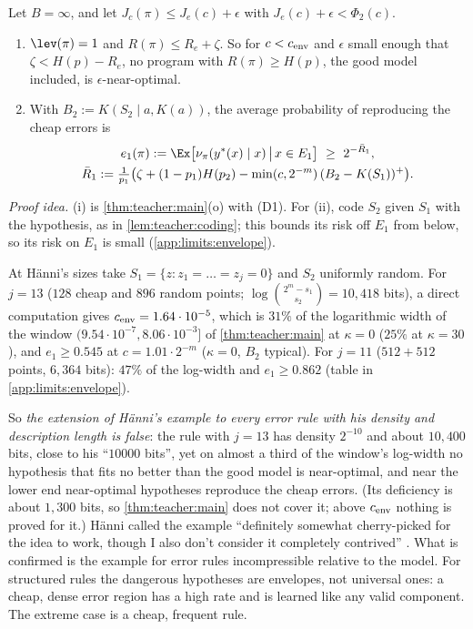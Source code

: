 \begin{proposition}\label{prop:limits:envelope}
Let $B=\infty$, and let $J_c(\pi)\le J_e(c)+\epsilon$ with $J_e(c)+\epsilon<\Phi_2(c)$.
\begin{enumerate}[label=(\roman*)]
\item $\lev(\pi)=1$ and $R(\pi)\le R_e+\zeta$. So for $c<c_{\rm env}$ and $\epsilon$ small enough that $\zeta<H(p)-R_e$, no program with $R(\pi)\ge H(p)$, the good model included, is $\epsilon$-near-optimal.
\item With $B_2:=K(S_2\mid a,K(a))$, the average probability of reproducing the cheap errors is
\begin{gather*}
e_1(\pi):=\Ex\big[\nu_\pi(y^*(x)\mid x)\,\big|\,x\in E_1\big]\ \ge\ 2^{-\bar R_1},\\
\bar R_1:=\tfrac1{p_1}\big(\zeta+(1-p_1)H(p_2)-\min(c,2^{-m})\,(B_2-K(S_1))^+\big).
\end{gather*}
\end{enumerate}
\end{proposition}

\emph{Proof idea.} (i) is \cref{thm:teacher:main}(o) with (D1). For (ii), code $S_2$ given $S_1$ with the hypothesis, as in \cref{lem:teacher:coding}; this bounds its risk off $E_1$ from below, so its risk on $E_1$ is small (\cref{app:limits:envelope}).

At H\"anni's sizes take $S_1=\{z:z_1=\dots=z_j=0\}$ and $S_2$ uniformly random. For $j=13$ ($128$ cheap and $896$ random points; $\log\binom{2^m-s_1}{s_2}=10{,}418$ bits), a direct computation gives $c_{\rm env}=1.64\cdot10^{-5}$, which is $31\%$ of the logarithmic width of the window $(9.54\cdot10^{-7},8.06\cdot10^{-3}]$ of \cref{thm:teacher:main} at $\kappa=0$ ($25\%$ at $\kappa=30$), and $e_1\ge0.545$ at $c=1.01\cdot2^{-m}$ ($\kappa=0$, $B_2$ typical). For $j=11$ ($512+512$ points, $6{,}364$ bits): $47\%$ of the log-width and $e_1\ge0.862$ (table in \cref{app:limits:envelope}).

So \emph{the extension of H\"anni's example to every error rule with his density and description length is false}: the rule with $j=13$ has density $2^{-10}$ and about $10{,}400$ bits, close to his ``$10000$ bits'', yet on almost a third of the window's log-width no hypothesis that fits no better than the good model is near-optimal, and near the lower end near-optimal hypotheses reproduce the cheap errors. (Its deficiency is about $1{,}300$ bits, so \cref{thm:teacher:main} does not cover it; above $c_{\rm env}$ nothing is proved for it.) H\"anni called the example ``definitely somewhat cherry-picked for the idea to work, though I also don't consider it completely contrived'' \citep{hanni2026lesswrong}. What is confirmed is the example for error rules incompressible relative to the model. For structured rules the dangerous hypotheses are envelopes, not universal ones: a cheap, dense error region has a high rate and is learned like any valid component. The extreme case is a cheap, frequent rule.


